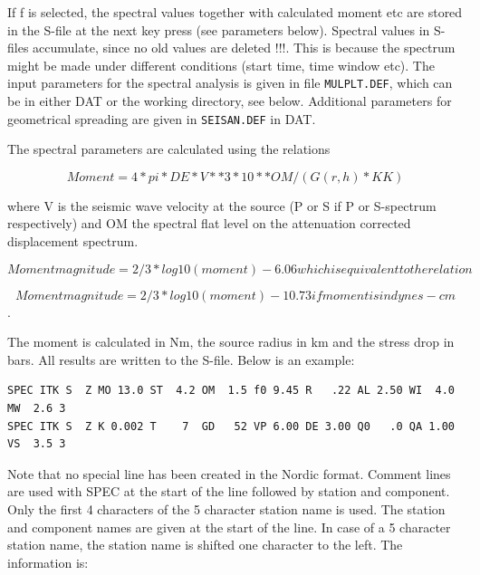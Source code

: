If f is selected, the spectral values together with calculated moment etc are stored in the S-file at the next key press (see parameters below). Spectral values in S-files accumulate, since no old values are deleted !!!. This is because the spectrum might be made under different conditions (start time, time window etc). The input parameters for the spectral analysis is given in file \texttt{MULPLT.DEF}, which can be in either DAT or the working directory, see below. Additional parameters for geometrical spreading are given in \texttt{SEISAN.DEF} in DAT. 

The spectral parameters are calculated using the relations 

\begin{displaymath}
Moment = 4 * pi * DE * V**3 * 10**OM /( G(r,h) * KK) 
\end{displaymath}

where V is the seismic wave velocity at the source (P or S if P or S-spectrum respectively) and OM the spectral flat level on the attenuation corrected displacement spectrum. 

\begin{displaymath}
Moment magnitude = 2/3 * log10(moment) - 6.06  which is equivalent to the relation 
\end{displaymath}

\begin{displaymath}
Moment magnitude = 2/3 * log10(moment) -10.73 if moment is in dynes-cm 
\end{displaymath}
\citep{kanamori1977}. 

The moment is calculated in Nm, the source radius in km and the stress drop in bars. All results are written to the S-file. Below is an example: 

\begin{verbatim}
SPEC ITK S  Z MO 13.0 ST  4.2 OM  1.5 f0 9.45 R   .22 AL 2.50 WI  4.0 MW  2.6 3
SPEC ITK S  Z K 0.002 T    7  GD   52 VP 6.00 DE 3.00 Q0   .0 QA 1.00 VS  3.5 3
\end{verbatim}

Note that no special line has been created in the Nordic format. Comment lines are used with SPEC at the start of the line followed by station and component. Only the first 4 characters of the 5 character 
station name is used. The station and component names are given at the start of the line. In case of
a 5 character station name, the station name is shifted one character to the left.
The information is: 

